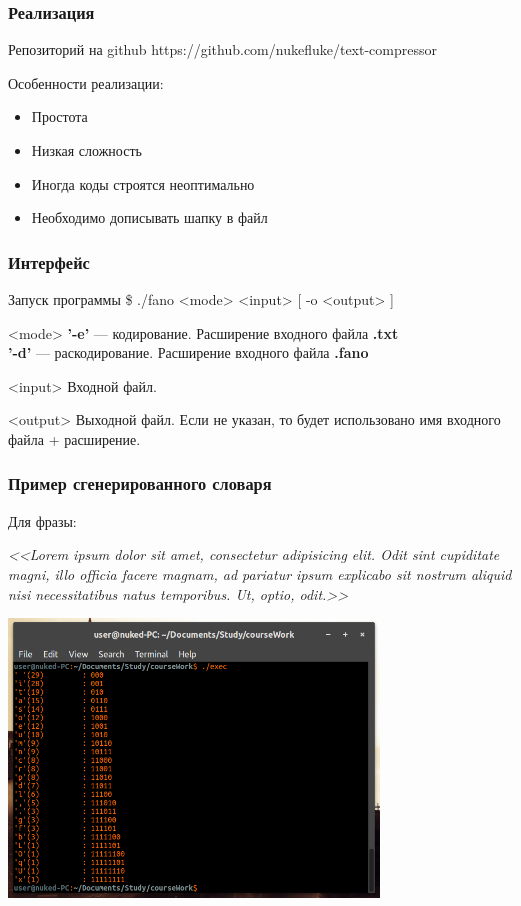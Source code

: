 \documentclass[10pt,pdf,hyperref={unicode}]{beamer}
\begin{document}
\begin{frame}
	\frametitle{Реализация}

	\begin{block}{Репозиторий на github}
		https://github.com/nukefluke/text-compressor
	\end{block}
	\vspace{1em}
	Особенности реализации:
	\begin{itemize}
		\item Простота
		\item Низкая сложность
		\item Иногда коды строятся неоптимально
		\item Необходимо дописывать шапку в файл
	\end{itemize}
\end{frame}

\begin{frame}
	\frametitle{Интерфейс}
	\begin{block}{Запуск программы}
		\$ ./fano <mode> <input> [ -o <output> ]
	\end{block}
	\begin{exampleblock}{<mode>}
		\textbf{'-e'} --- кодирование. Расширение входного файла \textbf{.txt}\\
		\textbf{'-d'} --- раскодирование. Расширение входного файла \textbf{.fano}
	\end{exampleblock}
	\begin{exampleblock}{<input>}
		Входной файл.
	\end{exampleblock}
	\begin{exampleblock}{<output>}
		Выходной файл. Если не указан, то будет 
		использовано имя входного файла + расширение.
	\end{exampleblock}
\end{frame}

\begin{frame}
	\frametitle{Пример сгенерированного словаря}
	Для фразы:

	\vspace{1em}
	\scriptsize{\textit{<<Lorem ipsum dolor sit amet, consectetur adipisicing elit. 
	Odit sint cupiditate magni, illo officia facere magnam, ad pariatur ipsum explicabo 
	sit nostrum aliquid nisi necessitatibus natus temporibus. Ut, optio, odit.>>}}

	\vspace{1em}
	\centerline{\includegraphics[height=20em]{gen.png}}
\end{frame}
\end{document}
